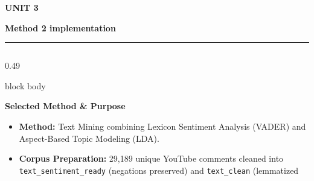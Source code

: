 \documentclass[aspectratio=169, 10pt]{beamer}
\newcommand{\slideheader}[3]{%
        \vspace{-0.25cm}%
        \noindent\begin{minipage}[t]{0.88\linewidth}%
            {\fontsize{7pt}{8.5pt}\selectfont \textbf{\color{BlueAccent}#1}}\par\vspace{1pt}%
            {\fontsize{11.5pt}{13.5pt}\selectfont \textbf{\color{NavyPrimary}#2}}%
        \end{minipage}%
        \hfill%
        \begin{minipage}[t]{0.10\linewidth}%
            \raggedleft{\fontsize{12pt}{14pt}\selectfont \textbf{\color{CoralAccent}#3}}%
        \end{minipage}\par%
        \vspace{2pt}%
        \textcolor{CardBorder}{\rule{\linewidth}{0.6pt}}\par%
        \vspace{3pt}%
    }
\newenvironment{card}[1][]{%
        \begin{beamercolorbox}[rounded=true,shadow=false,wd=\linewidth,sep=3.5pt,#1]{block body}%
        \fontsize{7.8pt}{9.8pt}\selectfont%
    }{%
        \end{beamercolorbox}%
    }
\begin{document}
    \begin{frame}[t]                                                                                                                                                                                   
        \slideheader{UNIT 3}{Method 2 implementation}{12}                                                                                                                                              
        \begin{columns}[T]                                                                                                                                                                             
            \begin{column}{0.49\textwidth}                                                                                                                                                             
                \begin{card}                                                                                                                                                                           
                    {\fontsize{8pt}{9.5pt}\selectfont \textbf{\color{NavyPrimary}Selected Method \& Purpose}}\\[0.06cm]                                                                                
                    \begin{itemize}\setlength{\itemsep}{2pt}                                                                                                                                           
                        \item \textbf{Method:} Text Mining combining Lexicon Sentiment Analysis (VADER) and Aspect-Based Topic Modeling (LDA).                                                         
                        \item \textbf{Corpus Preparation:} 29,189 unique YouTube comments cleaned into \texttt{text\_sentiment\_ready} (negations preserved) and \texttt{text\_clean} (lemmatized      

\end{itemize}
\end{card}
\end{column}
\end{columns}
\end{frame}
\end{document}
